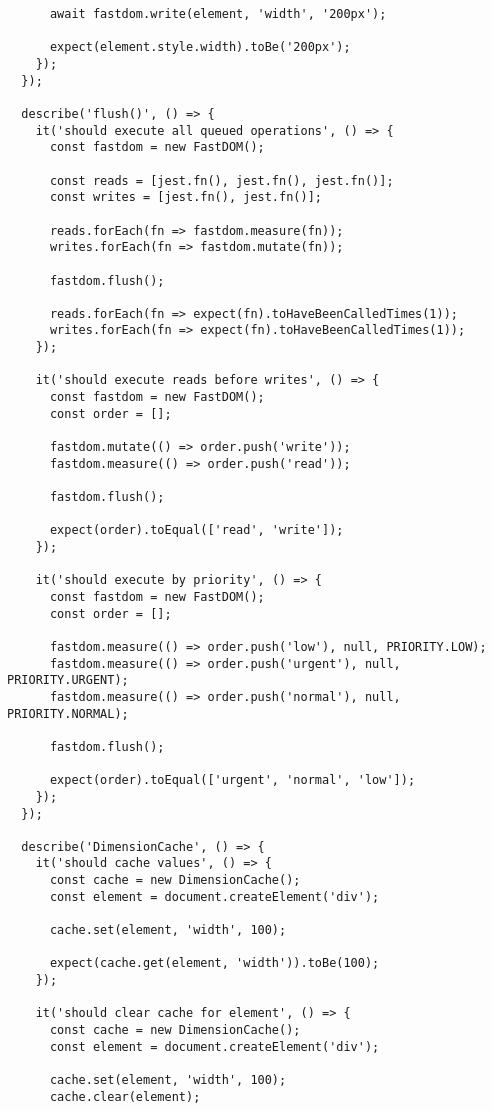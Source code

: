 \documentclass[11pt]{article}
\begin{document}
\begin{verbatim}
      await fastdom.write(element, 'width', '200px');
      
      expect(element.style.width).toBe('200px');
    });
  });
  
  describe('flush()', () => {
    it('should execute all queued operations', () => {
      const fastdom = new FastDOM();
      
      const reads = [jest.fn(), jest.fn(), jest.fn()];
      const writes = [jest.fn(), jest.fn()];
      
      reads.forEach(fn => fastdom.measure(fn));
      writes.forEach(fn => fastdom.mutate(fn));
      
      fastdom.flush();
      
      reads.forEach(fn => expect(fn).toHaveBeenCalledTimes(1));
      writes.forEach(fn => expect(fn).toHaveBeenCalledTimes(1));
    });
    
    it('should execute reads before writes', () => {
      const fastdom = new FastDOM();
      const order = [];
      
      fastdom.mutate(() => order.push('write'));
      fastdom.measure(() => order.push('read'));
      
      fastdom.flush();
      
      expect(order).toEqual(['read', 'write']);
    });
    
    it('should execute by priority', () => {
      const fastdom = new FastDOM();
      const order = [];
      
      fastdom.measure(() => order.push('low'), null, PRIORITY.LOW);
      fastdom.measure(() => order.push('urgent'), null, PRIORITY.URGENT);
      fastdom.measure(() => order.push('normal'), null, PRIORITY.NORMAL);
      
      fastdom.flush();
      
      expect(order).toEqual(['urgent', 'normal', 'low']);
    });
  });
  
  describe('DimensionCache', () => {
    it('should cache values', () => {
      const cache = new DimensionCache();
      const element = document.createElement('div');
      
      cache.set(element, 'width', 100);
      
      expect(cache.get(element, 'width')).toBe(100);
    });
    
    it('should clear cache for element', () => {
      const cache = new DimensionCache();
      const element = document.createElement('div');
      
      cache.set(element, 'width', 100);
      cache.clear(element);
      

\end{verbatim}
\end{document}
